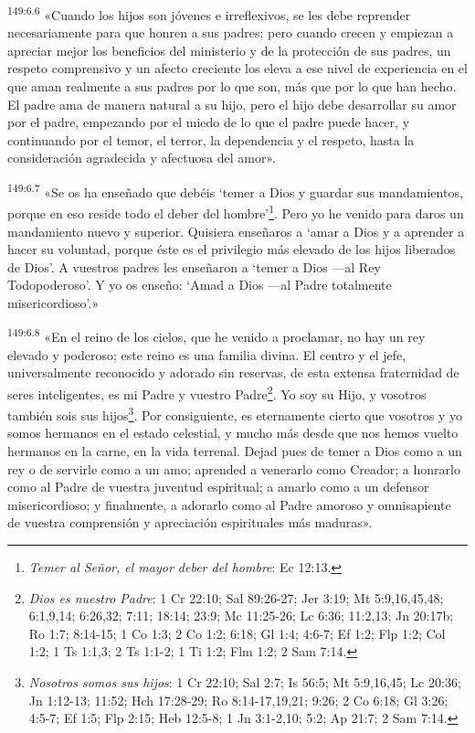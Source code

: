 \par 
\textsuperscript{149:6.6} «Cuando los hijos son jóvenes e irreflexivos, se les debe reprender necesariamente para que honren a sus padres; pero cuando crecen y empiezan a apreciar mejor los beneficios del ministerio y de la protección de sus padres, un respeto comprensivo y un afecto creciente los eleva a ese nivel de experiencia en el que aman realmente a sus padres por lo que son, más que por lo que han hecho. El padre ama de manera natural a su hijo, pero el hijo debe desarrollar su amor por el padre, empezando por el miedo de lo que el padre puede hacer, y continuando por el temor, el terror, la dependencia y el respeto, hasta la consideración agradecida y afectuosa del amor».

\par 
\textsuperscript{149:6.7} «Se os ha enseñado que debéis `temer a Dios y guardar sus mandamientos, porque en eso reside todo el deber del hombre'\footnote{\textit{Temer al Señor, el mayor deber del hombre}: Ec 12:13.}. Pero yo he venido para daros un mandamiento nuevo y superior. Quisiera enseñaros a `amar a Dios y a aprender a hacer su voluntad, porque éste es el privilegio más elevado de los hijos liberados de Dios'. A vuestros padres les enseñaron a `temer a Dios ---al Rey Todopoderoso'. Y yo os enseño: `Amad a Dios ---al Padre totalmente misericordioso'.»

\par 
\textsuperscript{149:6.8} «En el reino de los cielos, que he venido a proclamar, no hay un rey elevado y poderoso; este reino es una familia divina. El centro y el jefe, universalmente reconocido y adorado sin reservas, de esta extensa fraternidad de seres inteligentes, es mi Padre y vuestro Padre\footnote{\textit{Dios es nuestro Padre}: 1 Cr 22:10; Sal 89:26-27; Jer 3:19; Mt 5:9,16,45,48; 6:1,9,14; 6:26,32; 7:11; 18:14; 23:9; Mc 11:25-26; Lc 6:36; 11:2,13; Jn 20:17b; Ro 1:7; 8:14-15; 1 Co 1:3; 2 Co 1:2; 6:18; Gl 1:4; 4:6-7; Ef 1:2; Flp 1:2; Col 1:2; 1 Ts 1:1,3; 2 Ts 1:1-2; 1 Ti 1:2; Flm 1:2; 2 Sam 7:14.}. Yo soy su Hijo, y vosotros también sois sus hijos\footnote{\textit{Nosotros somos sus hijos}: 1 Cr 22:10; Sal 2:7; Is 56:5; Mt 5:9,16,45; Lc 20:36; Jn 1:12-13; 11:52; Hch 17:28-29; Ro 8:14-17,19,21; 9:26; 2 Co 6:18; Gl 3:26; 4:5-7; Ef 1:5; Flp 2:15; Heb 12:5-8; 1 Jn 3:1-2,10; 5:2; Ap 21:7; 2 Sam 7:14.}. Por consiguiente, es eternamente cierto que vosotros y yo somos hermanos en el estado celestial, y mucho más desde que nos hemos vuelto hermanos en la carne, en la vida terrenal. Dejad pues de temer a Dios como a un rey o de servirle como a un amo; aprended a venerarlo como Creador; a honrarlo como al Padre de vuestra juventud espiritual; a amarlo como a un defensor misericordioso; y finalmente, a adorarlo como al Padre amoroso y omnisapiente de vuestra comprensión y apreciación espirituales más maduras».

